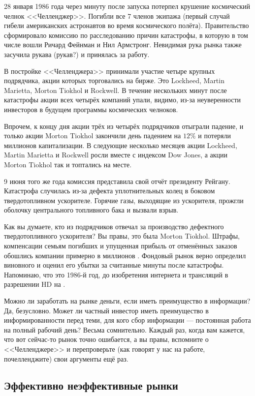 28 января 1986 года через минуту после запуска потерпел крушение 
космический челнок <<Челленджер>>. Погибли все 7 членов экипажа (первый случай 
гибели американских астронавтов во время космического полёта). Правительство 
сформировало комиссию по расследованию причин катастрофы, в которую в том числе 
вошли Ричард Фейнман и Нил Армстронг. Невидимая рука рынка также засучила 
рукава (рукав?) и принялась за работу. 

В постройке <<Челленджера>> принимали участие четыре крупных подрядчика, акции 
которых торговались на бирже. Это Lockheed, Martin Marietta, Morton Tiokhol и 
Rockwell. В течение нескольких минут после катастрофы акции всех четырёх 
компаний упали, видимо, из-за неуверенности инвесторов в будущем программы 
космических челноков.

Впрочем, к концу дня акции трёх из четырёх подрядчиков отыграли падение, и 
только акции Morton Tiokhol закончили день падением на $12\%$ и потеряли 
 миллионов капитализации. В следующие несколько месяцев акции 
Lockheed, Martin Marietta и Rockwell росли вместе с индексом Dow Jones, а акции 
Morton Tiokhol так и топтались на месте.

9 июня того же года комиссия представила свой отчёт президенту Рейгану. 
Катастрофа случилась из-за дефекта уплотнительных колец в боковом 
твердотопливном ускорителе. Горячие газы, выходящие из ускорителя, прожгли 
оболочку центрального топливного бака и вызвали взрыв.

Как вы думаете, кто из подрядчиков отвечал за производство дефектного 
твердотопливного ускорителя? Вы правы, это была Morton Tiokhol. Штрафы, 
компенсации семьям погибших и упущенная прибыль от отменённых заказов обошлись 
компании примерно в  миллионов \cite{maloney2003complexity}. 
Фондовый рынок верно определил виновного и оценил его убытки за считанные минуты 
после катастрофы. Напоминаю, что это 1986-й год, до изобретения интернета и 
трансляций в разрешении HD на .

Можно ли заработать на рынке деньги, если иметь преимущество в информации? Да,
безусловно. Может ли частный инвестор иметь преимущество в информированности 
перед теми, для кого сбор информации --- постоянная работа на полный рабочий 
день? Весьма сомнительно. Каждый раз, когда вам кажется, что вот сейчас-то рынок
точно ошибается, а вы правы, вспомните о <<Челленджере>> и перепроверьте (как 
говорят у нас на работе, почелленджите) свои аргументы ещё раз.

\subsection{Эффективно неэффективные рынки}

